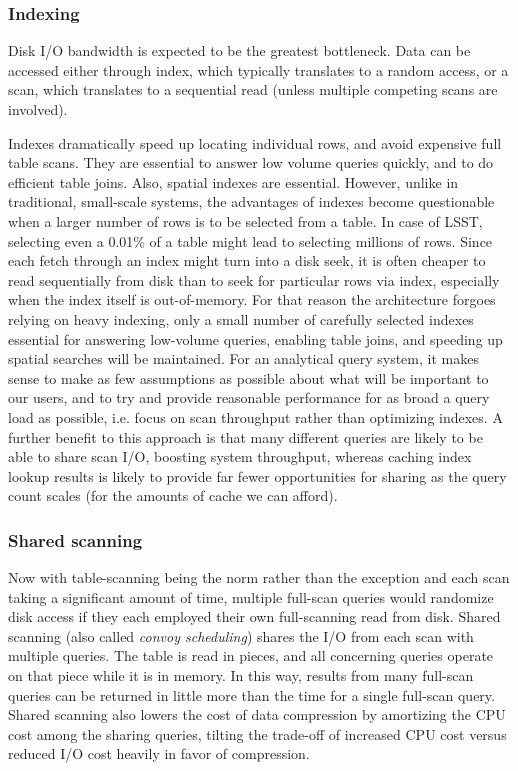 \documentclass[DM,lsstdraft,toc]{lsstdoc}
\begin{document}
\subsubsection{Indexing}\label{indexing}

Disk I/O bandwidth is expected to be the greatest bottleneck. Data can
be accessed either through index, which typically translates to a random
access, or a scan, which translates to a sequential read (unless
multiple competing scans are involved).

Indexes dramatically speed up locating individual rows, and avoid
expensive full table scans. They are essential to answer low volume
queries quickly, and to do efficient table joins. Also, spatial indexes
are essential. However, unlike in traditional, small-scale systems, the
advantages of indexes become questionable when a larger number of rows
is to be selected from a table. In case of LSST, selecting even a 0.01\%
of a table might lead to selecting millions of rows. Since each fetch
through an index might turn into a disk seek, it is often cheaper to
read sequentially from disk than to seek for particular rows via index,
especially when the index itself is out-of-memory. For that reason the
architecture forgoes relying on heavy indexing, only a small number of
carefully selected indexes essential for answering low-volume queries,
enabling table joins, and speeding up spatial searches will be
maintained. For an analytical query system, it makes sense to make as
few assumptions as possible about what will be important to our users,
and to try and provide reasonable performance for as broad a query load
as possible, i.e. focus on scan throughput rather than optimizing
indexes. A further benefit to this approach is that many different
queries are likely to be able to share scan I/O, boosting system
throughput, whereas caching index lookup results is likely to provide
far fewer opportunities for sharing as the query count scales (for the
amounts of cache we can afford).

\subsubsection{Shared scanning}\label{shared-scanning}

Now with table-scanning being the norm rather than the exception and
each scan taking a significant amount of time, multiple full-scan
queries would randomize disk access if they each employed their own
full-scanning read from disk. Shared scanning (also called \emph{convoy
scheduling}) shares the I/O from each scan with multiple queries. The
table is read in pieces, and all concerning queries operate on that
piece while it is in memory. In this way, results from many full-scan
queries can be returned in little more than the time for a single
full-scan query. Shared scanning also lowers the cost of data
compression by amortizing the CPU cost among the sharing queries,
tilting the trade-off of increased CPU cost versus reduced I/O cost
heavily in favor of compression.
\end{document}
